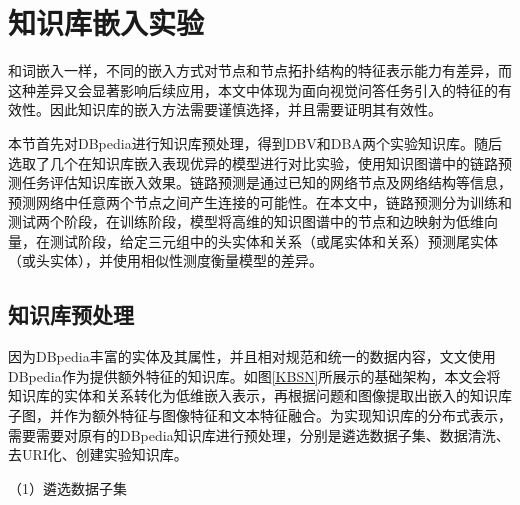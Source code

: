 

\section{知识库嵌入实验}
和词嵌入一样，不同的嵌入方式对节点和节点拓扑结构的特征表示能力有差异，而这种差异又会显著影响后续应用，本文中体现为面向视觉问答任务引入的特征的有效性。因此知识库的嵌入方法需要谨慎选择，并且需要证明其有效性。

本节首先对DBpedia进行知识库预处理，得到DBV和DBA两个实验知识库。随后选取了几个在知识库嵌入表现优异的模型进行对比实验，使用知识图谱中的链路预测任务评估知识库嵌入效果。链路预测是通过已知的网络节点及网络结构等信息，预测网络中任意两个节点之间产生连接的可能性。在本文中，链路预测分为训练和测试两个阶段，在训练阶段，模型将高维的知识图谱中的节点和边映射为低维向量，在测试阶段，给定三元组中的头实体和关系（或尾实体和关系）预测尾实体（或头实体），并使用相似性测度衡量模型的差异。

\subsection{知识库预处理}
因为DBpedia丰富的实体及其属性，并且相对规范和统一的数据内容，文文使用DBpedia作为提供额外特征的知识库。如图\ref{KBSN}所展示的基础架构，本文会将知识库的实体和关系转化为低维嵌入表示，再根据问题和图像提取出嵌入的知识库子图，并作为额外特征与图像特征和文本特征融合。为实现知识库的分布式表示，需要需要对原有的DBpedia知识库进行预处理，分别是遴选数据子集、数据清洗、去URI化、创建实验知识库。

（1）遴选数据子集

